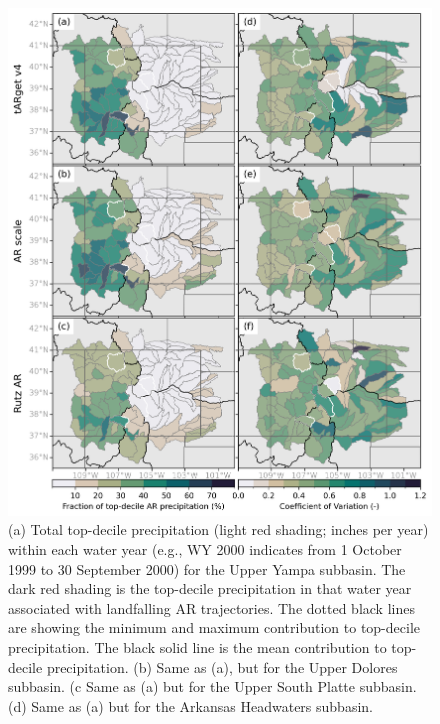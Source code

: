\documentclass[draft]{agujournal2019}
\begin{document}
\begin{figure}
\noindent\includegraphics[width=\textwidth, height=\textheight, keepaspectratio]{fig8.png}

\caption{(a) Total top-decile precipitation (light red shading; inches per year) within each water year (e.g., WY 2000 indicates from 1 October 1999 to 30 September 2000) for the Upper Yampa subbasin. The dark red shading is the top-decile precipitation in that water year associated with landfalling AR trajectories. The dotted black lines are showing the minimum and maximum contribution to top-decile precipitation. The black solid line is the mean contribution to top-decile precipitation. (b) Same as (a), but for the Upper Dolores subbasin. (c Same as (a) but for the Upper South Platte subbasin. (d) Same as (a) but for the Arkansas Headwaters subbasin.}
\label{fig:time_series}
\end{figure}
\end{document}
